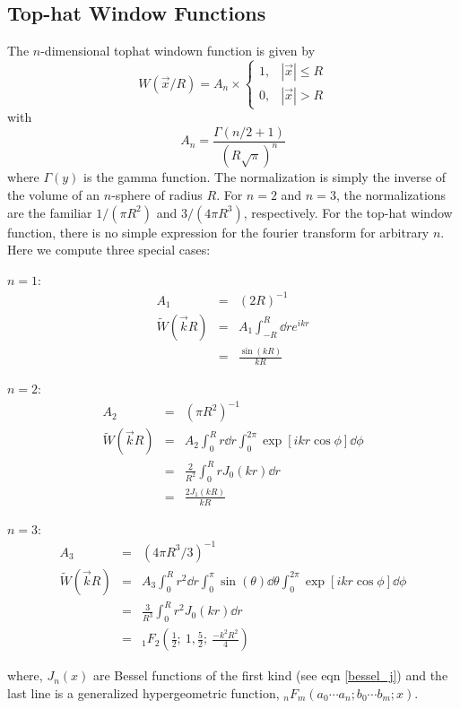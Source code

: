 \subsection{Top-hat Window Functions}
The $n$-dimensional tophat windown function is given by
\begin{equation}
W(\vec x/R) = A_n
\times\left\{
\begin{array}{ll}
  1, & |\vec x|\le R\\
  0, & |\vec x|>R
\end{array}
\right.
\end{equation}
with
\begin{equation}
  A_n = \frac{\Gamma(n/2+1)}{(R\sqrt\pi)^n}
\end{equation}
where $\Gamma(y)$ is the gamma function.  The normalization is simply the
inverse of the volume of an $n$-sphere of radius $R$.   
For $n=2$ and $n=3$, the normalizations are the familiar 
$1/(\pi R^2)$ and $3/(4\pi R^3)$, respectively.
For the top-hat window function, there is no
simple expression for the fourier transform for arbitrary $n$. 
Here we compute three special cases:
\begin{description}
  \item{$n=1$}:
    \begin{eqnarray}
      \label{tophat1D}
      A_1 &=& (2R)^{-1}\nonumber\\
      \widetilde W(\vec k R) &=& A_1\int_{-R}^{R}\dd r e^{ikr} \nonumber\\
      &=&\frac{\sin(kR)}{kR}
    \end{eqnarray}
  \item{$n=2$}:
    \begin{eqnarray}
      \label{tophat2D}
      A_2 &=& (\pi R^2)^{-1}\nonumber\\
      \widetilde W(\vec k R) &=& A_2\int_0^R r\dd r\int_0^{2\pi} \exp[ikr\cos\phi]\dd\phi\nonumber\\
      &=& \frac{2}{R^2}\int_0^R r J_0(kr)\dd r \nonumber\\
      &=& \frac{2J_1(kR)}{kR}
    \end{eqnarray}
  \item{$n=3$}: 
    \begin{eqnarray}
      \label{tophat3D}
      A_3 &=& (4\pi R^3/3)^{-1}\nonumber\\
      \widetilde W(\vec k R) &=& A_3\int_0^Rr^2\dd r\int_0^\pi \sin(\theta)\dd\theta\int_0^{2\pi}\exp[ikr\cos\phi]\dd\phi\nonumber\\
      &=& \frac{3}{R^3}\int_0^R r^2 J_0(kr)\dd r\nonumber\\
      &=& _1F_2(\frac{1}{2};\ 1,\frac{5}{2};\ \frac{-k^2R^2}{4})
    \end{eqnarray}
\end{description}
where, $J_n(x)$ are Bessel functions of the first kind (see eqn \ref{bessel_j})
and the last line is a generalized hypergeometric function, 
$_nF_m(a_0\cdots a_n;b_0\cdots b_m;x)$.  